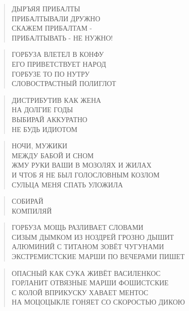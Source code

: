 \poemtitle{***}
\begin{verse}
ДЫРЪЯЯ ПРИБАЛТЫ\\
ПРИБАЛТЫВАЛИ ДРУЖНО\\
СКАЖЕМ ПРИБАЛТАМ - \\
ПРИБАЛТЫВАТЬ - НЕ НУЖНО!
\end{verse}

\poemtitle{***}
\begin{verse}
ГОРБУЗА ВЛЕТЕЛ В КОНФУ\\
ЕГО ПРИВЕТСТВУЕТ НАРОД\\
ГОРБУЗЕ ТО ПО НУТРУ\\
СЛОВОСТРАСТНЫЙ ПОЛИГЛОТ
\end{verse}

\poemtitle{***}
\begin{verse}
ДИСТРИБУТИВ КАК ЖЕНА\\
НА ДОЛГИЕ ГОДЫ\\
ВЫБИРАЙ АККУРАТНО\\
НЕ БУДЬ ИДИОТОМ
\end{verse}

\poemtitle{***}
\begin{verse}
НОЧИ, МУЖИКИ\\
МЕЖДУ БАБОЙ И СНОМ\\
ЖМУ РУКИ ВАШИ В МОЗОЛЯХ И ЖИЛАХ\\
И ЧТОБ Я НЕ БЫЛ ГОЛОСЛОВНЫМ КОЗЛОМ\\
СУЛЬЦА МЕНЯ СПАТЬ УЛОЖИЛА
\end{verse}

\poemtitle{***}
\begin{verse}
СОБИРАЙ\\
КОМПИЛЯЙ
\end{verse}

\poemtitle{***}
\begin{verse}
ГОРБУЗА МОЩЬ РАЗЛИВАЕТ СЛОВАМИ\\
СИЗЫМ ДЫМКОМ ИЗ НОЗДРЕЙ ГРОЗНО ДЫШИТ\\
АЛЮМИНИЙ С ТИТАНОМ ЗОВЁТ ЧУГУНАМИ\\
ЭКСТРЕМИСТСКИЕ МАРШИ ПО ВЕЧЕРАМИ ПИШЕТ
\end{verse}

\poemtitle{***}
\begin{verse}
ОПАСНЫЙ КАК СУКА ЖИВЁТ ВАСИЛЕНКОС\\
ГОРЛАНИТ ОТВЯЗНЫЕ МАРШИ ФОШИСТСКИЕ\\
С КОЛОЙ ВПРИКУСКУ ХАВАЕТ МЕНТОС\\
НА МОЦОЦЫКЛЕ ГОНЯЕТ СО СКОРОСТЬЮ ДИКОЮ
\end{verse}

